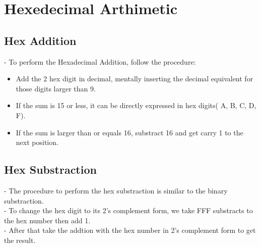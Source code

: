 \documentclass[12pt]{article}
\begin{document}
\section{Hexedecimal Arthimetic}
\subsection{Hex Addition}
- To perform the Hexadecimal Addition, follow the procedure: \\
\begin{itemize}
	\item Add the 2 hex digit in decimal, mentally inserting the decimal equivalent for those digits larger than 9.
	\item If the sum is 15 or less, it can be directly expressed in hex digits( A, B, C, D, F).
	\item If the sum is larger than or equals 16, substract 16 and get carry 1 to the next position.
\end{itemize}
\subsection{Hex Substraction}
- The procedure to perform the hex substraction is similar to the binary substraction. \\
- To change the hex digit to its 2's complement form, we take FFF substracts to the hex number then add 1. \\
- After that take the addtion with the hex number in 2's complement form to get the result. \\
\end{document}
